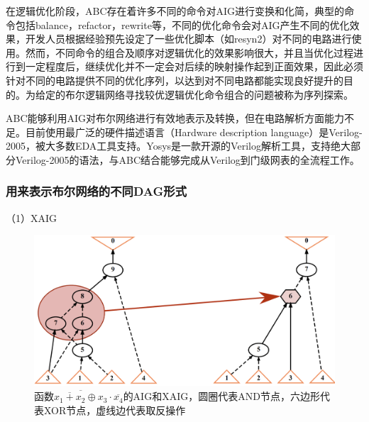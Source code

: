 


在逻辑优化阶段，ABC存在着许多不同的命令对AIG进行变换和化简，典型的命令包括balance，refactor，rewrite等，不同的优化命令会对AIG产生不同的优化效果，开发人员根据经验预先设定了一些优化脚本（如resyn2）对不同的电路进行使用。然而，不同命令的组合及顺序对逻辑优化的效果影响很大，并且当优化过程进行到一定程度后，继续优化并不一定会对后续的映射操作起到正面效果\cite{LS:PIMap}，因此必须针对不同的电路提供不同的优化序列，以达到对不同电路都能实现良好提升的目的。为给定的布尔逻辑网络寻找较优逻辑优化命令组合的问题被称为序列探索。

ABC能够利用AIG对布尔网络进行有效地表示及转换，但在电路解析方面能力不足。目前使用最广泛的硬件描述语言（Hardware description language）是Verilog-2005，被大多数EDA工具支持。Yosys\cite{LS:yosys}是一款开源的Verilog解析工具，支持绝大部分Verilog-2005的语法，与ABC结合能够完成从Verilog到门级网表的全流程工作。

\subsubsection{用来表示布尔网络的不同DAG形式}

（1）XAIG

\begin{figure}[!htbp]
    \centering
    \includegraphics[width=0.75\linewidth]{./figs/LS-XAIG.png}
    \caption{函数$ \overline{ \overline{x_1 + x_2} \oplus x_3} \cdot \overline{x_4} $的AIG和XAIG，圆圈代表AND节点，六边形代表XOR节点，虚线边代表取反操作}
    \label{LS:XAIG}
\end{figure}

